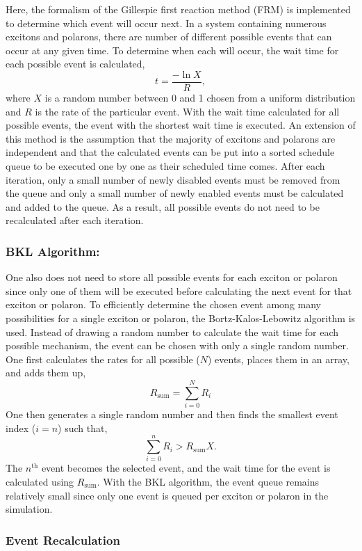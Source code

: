 \documentclass[%
 reprint,onecolumn,notitlepage,
superscriptaddress,longbibliography,
 amsmath,amssymb,
 aps,rmp,floatfix,
]{revtex4-1}
\begin{document}
Here, the formalism of the Gillespie first reaction method (FRM) is implemented to determine which event will occur next.\cite{gillespie1976jcp} 
In a system containing numerous excitons and polarons, there are number of different possible events that can occur at any given time. 
To determine when each will occur, the wait time for each possible event is calculated,
$$t = \frac{-\ln{X}}{R},$$
where $X$ is a random number between 0 and 1 chosen from a uniform distribution and $R$ is the rate of the particular event. 
With the wait time calculated for all possible events, the event with the shortest wait time is executed. 
An extension of this method is the assumption that the majority of excitons and polarons are independent and that the calculated events can be put into a sorted schedule queue to be executed one by one as their scheduled time comes. 
After each iteration, only a small number of newly disabled events must be removed from the queue and only a small number of newly enabled events must be calculated and added to the queue. 
As a result, all possible events do not need to be recalculated after each iteration.

\subsubsection{BKL Algorithm:}

One also does not need to store all possible events for each exciton or polaron since only one of them will be executed before calculating the next event for that exciton or polaron. 
To efficiently determine the chosen event among many possibilities for a single exciton or polaron, the Bortz-Kalos-Lebowitz algorithm is used.\cite{bortz1974prb}
Instead of drawing a random number to calculate the wait time for each possible mechanism, the event can be chosen with only a single random number. 
One first calculates the rates for all possible ($N$) events, places them in an array, and adds them up,
$$R_\text{sum} = \sum_{i=0}^N R_i$$
One then generates a single random number and then finds the smallest event index ($i=n$) such that,
$$\sum_{i=0}^n R_i > R_\text{sum}X.$$
The $n^\text{th}$ event becomes the selected event, and the wait time for the event is calculated using $R_\text{sum}$. 
With the BKL algorithm, the event queue remains relatively small since only one event is queued per exciton or polaron in the simulation.

\subsubsection{Event Recalculation}
\end{document}
